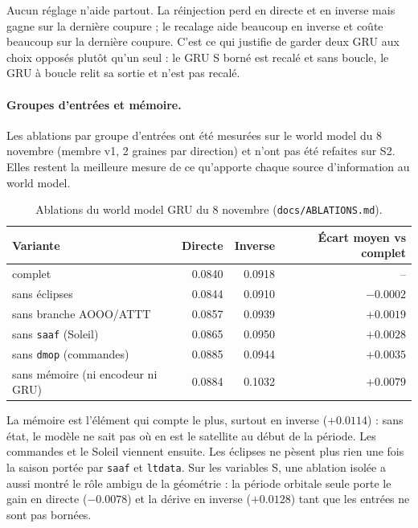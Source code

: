 \documentclass[11pt,a4paper]{article}
\newcommand{\code}[1]{\texttt{#1}}
\begin{document}
Aucun réglage n'aide partout. La réinjection perd en directe et en inverse mais gagne sur la dernière coupure ; le recalage aide beaucoup en inverse et coûte beaucoup sur la dernière coupure. C'est ce qui justifie de garder deux GRU aux choix opposés plutôt qu'un seul : le GRU S borné est recalé et sans boucle, le GRU à boucle relit sa sortie et n'est pas recalé.

\paragraph{Groupes d'entrées et mémoire.} Les ablations par groupe d'entrées ont été mesurées sur le world model du 8 novembre (membre v1, 2 graines par direction) et n'ont pas été refaites sur S2. Elles restent la meilleure mesure de ce qu'apporte chaque source d'information au world model.

\begin{table}[!htb]
\centering\small
\caption{Ablations du world model GRU du 8 novembre (\code{docs/ABLATIONS.md}).}
\label{tab:abl_entrees}
\begin{tabular}{l r r r}
\toprule
Variante & Directe & Inverse & Écart moyen vs complet \\
\midrule
complet & 0.0840 & 0.0918 & -- \\
sans éclipses & 0.0844 & 0.0910 & $-0.0002$ \\
sans branche AOOO/ATTT & 0.0857 & 0.0939 & $+0.0019$ \\
sans \code{saaf} (Soleil) & 0.0865 & 0.0950 & $+0.0028$ \\
sans \code{dmop} (commandes) & 0.0885 & 0.0944 & $+0.0035$ \\
sans mémoire (ni encodeur ni GRU) & 0.0884 & 0.1032 & $+0.0079$ \\
\bottomrule
\end{tabular}
\end{table}

La mémoire est l'élément qui compte le plus, surtout en inverse ($+0.0114$) : sans état, le modèle ne sait pas où en est le satellite au début de la période. Les commandes et le Soleil viennent ensuite. Les éclipses ne pèsent plus rien une fois la saison portée par \code{saaf} et \code{ltdata}. Sur les variables S, une ablation isolée a aussi montré le rôle ambigu de la géométrie : la période orbitale seule porte le gain en directe ($-0.0078$) et la dérive en inverse ($+0.0128$) tant que les entrées ne sont pas bornées.

\end{document}
